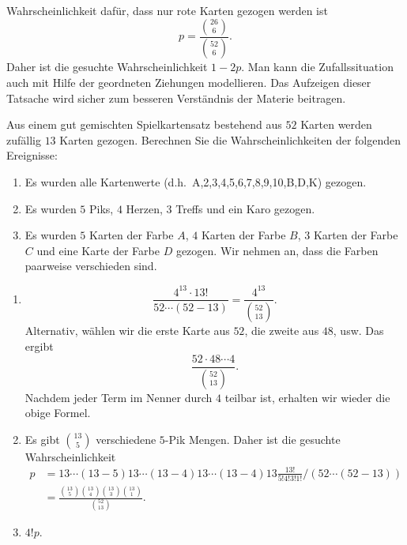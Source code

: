 \solution
Wahrscheinlichkeit dafür, dass nur rote Karten gezogen werden ist 
\begin{equation*}
    p = \frac{\binom{26}6}{\binom{52}{6}}.
\end{equation*}
Daher ist die gesuchte Wahrscheinlichkeit $1-2p$. Man kann die Zufallssituation
auch mit Hilfe der geordneten Ziehungen modellieren. Das Aufzeigen dieser
Tatsache wird sicher zum besseren Verständnis der Materie beitragen.

 Aus einem gut gemischten
Spielkartensatz bestehend aus $52$ Karten werden zufällig $13$ Karten gezogen.
Berechnen Sie die Wahrscheinlichkeiten der folgenden Ereignisse:
\begin{enumerate}
    \item Es wurden alle Kartenwerte (d.h.\ A,2,3,4,5,6,7,8,9,10,B,D,K) gezogen.
    \item Es wurden $5$ Piks, $4$ Herzen, $3$ Treffs und ein Karo gezogen.
    \item Es wurden $5$ Karten der Farbe $A$, $4$ Karten der Farbe $B$, $3$
        Karten der Farbe $C$ und eine Karte der Farbe $D$ gezogen. Wir nehmen
        an, dass die Farben paarweise verschieden sind. 
\end{enumerate}

\solution
\begin{enumerate}
    \item \[\frac{4^{13} \cdot 13!}{52 \cdots (52-13)} = \frac{4^{13}}{\binom{52}{13}}.\] 
        Alternativ, wählen wir die erste Karte aus $52$, die zweite aus $48$,
        usw. Das ergibt \[\frac{52\cdot 48 \cdots 4}{\binom{52}{13}}.\] Nachdem
        jeder Term im Nenner durch $4$ teilbar ist, erhalten wir wieder die
        obige Formel. 
    \item Es gibt $\binom{13}{5}$ verschiedene $5$-Pik Mengen. Daher ist die gesuchte
        Wahrscheinlichkeit
        \begin{align*}
            p &= 13\cdots(13-5) 13\cdots (13-4) 13\cdots(13-4) 13 \frac{13!}{5! 4! 3! 1!} / (52\cdots (52-13)) \\
            &= \frac{\binom{13}{5}  \binom{13}{4}   \binom{13}{3}   \binom{13}{1} }{ \binom{52}{13}}.
        \end{align*}
    \item $4! p$. 
\end{enumerate}

